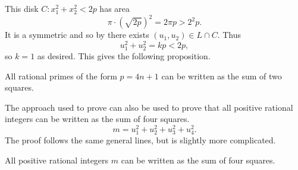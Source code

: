 This disk $C : x_1^2 + x_2^2 < 2p$ has area 
\[
\pi \cdot (\sqrt{2 p})^2 = 2 \pi p > 2^2 p.
\]
It is a symmetric  and so by 
there exists $(u_1, u_2) \in L \cap C$. Thus
\[
u_1^2 + u_2^2 = kp  < 2p,
\]
so $k= 1$ as desired.  This gives the following proposition.

\begin{proposition} \label{FF:2Squares:Sec}
All rational primes of the form $p= 4n+1$ can be written as the sum of
two squares.
\end{proposition}

The approach used to prove  can also be used
to prove that all positive rational integers can be written as the sum
of four squares.
\[
m = u_1^2 + u_2^2 + u_3^2 + u_4^2.
\]
The proof follows the same general lines, but is slightly more
complicated.

\begin{proposition}
All positive rational integers $m$ can be written as the sum of four squares.
\end{proposition}

